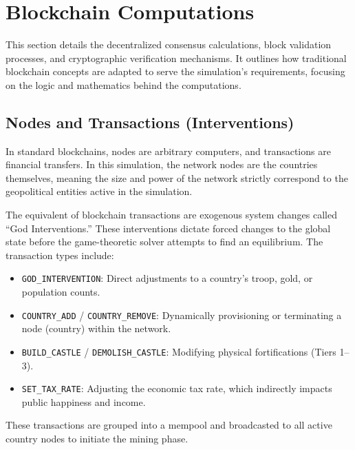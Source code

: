 \section{Blockchain Computations}
This section details the decentralized consensus calculations, block validation processes, and cryptographic verification mechanisms. It outlines how traditional blockchain concepts are adapted to serve the simulation's requirements, focusing on the logic and mathematics behind the computations.

\subsection{Nodes and Transactions (Interventions)}
In standard blockchains, nodes are arbitrary computers, and transactions are financial transfers. In this simulation, the network nodes are the countries themselves, meaning the size and power of the network strictly correspond to the geopolitical entities active in the simulation.

The equivalent of blockchain transactions are exogenous system changes called ``God Interventions.'' These interventions dictate forced changes to the global state before the game-theoretic solver attempts to find an equilibrium. The transaction types include:
\begin{itemize}
    \item \texttt{GOD\_INTERVENTION}: Direct adjustments to a country's troop, gold, or population counts.
    \item \texttt{COUNTRY\_ADD} / \texttt{COUNTRY\_REMOVE}: Dynamically provisioning or terminating a node (country) within the network.
    \item \texttt{BUILD\_CASTLE} / \texttt{DEMOLISH\_CASTLE}: Modifying physical fortifications (Tiers 1--3).
    \item \texttt{SET\_TAX\_RATE}: Adjusting the economic tax rate, which indirectly impacts public happiness and income.
\end{itemize}
These transactions are grouped into a mempool and broadcasted to all active country nodes to initiate the mining phase.

